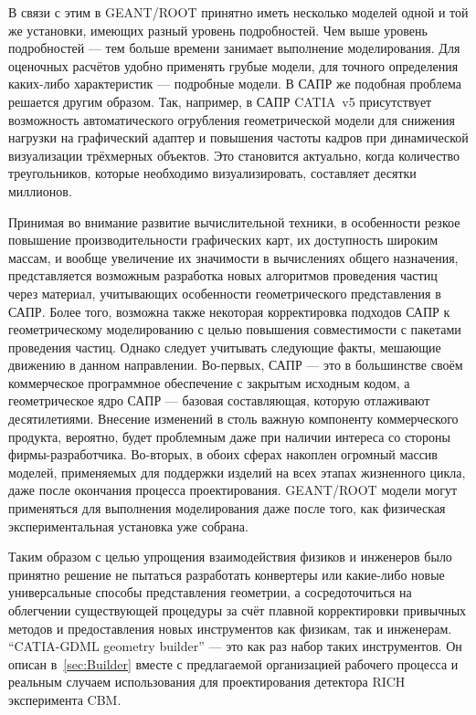В связи с этим в GEANT/ROOT принятно иметь несколько моделей одной и той же установки, имеющих разный уровень подробностей. Чем выше уровень подробностей --- тем больше времени занимает выполнение моделирования. Для оценочных расчётов удобно применять грубые модели, для точного определения каких-либо характеристик --- подробные модели. В САПР же подобная проблема решается другим образом. Так, например, в САПР CATIA~v5 присутствует возможность автоматического огрубления геометрической модели для снижения нагрузки на графический адаптер и повышения частоты кадров при динамической визуализации трёхмерных объектов. Это становится актуально, когда количество треугольников, которые необходимо визуализировать, составляет десятки миллионов.

Принимая во внимание развитие вычислительной техники, в особенности резкое повышение производительности графических карт, их доступность широким массам, и вообще увеличение их значимости в вычислениях общего назначения, представляется возможным разработка новых алгоритмов проведения частиц через материал, учитывающих особенности геометрического представления в САПР. Более того, возможна также некоторая корректировка подходов САПР к геометрическому моделированию с целью повышения совместимости с пакетами проведения частиц. Однако следует учитывать следующие факты, мешающие движению в данном направлении. Во-первых, САПР --- это в большинстве своём коммерческое программное обеспечение с закрытым исходным кодом, а геометрическое ядро САПР --- базовая составляющая, которую отлаживают десятилетиями. Внесение изменений в столь важную компоненту коммерческого продукта, вероятно, будет проблемным даже при наличии интереса со стороны фирмы-разработчика. Во-вторых, в обоих сферах накоплен огромный массив моделей, применяемых для поддержки изделий на всех этапах жизненного цикла, даже после окончания процесса проектирования. GEANT/ROOT модели могут применяться для выполнения моделирования даже после того, как физическая экспериментальная установка уже собрана.

Таким образом с целью упрощения взаимодействия физиков и инженеров было принятно решение не пытаться разработать конвертеры или какие-либо новые универсальные способы представления геометрии, а сосредоточиться на облегчении существующей процедуры за счёт плавной корректировки привычных методов и предоставления новых инструментов как физикам, так и инженерам. ``CATIA-GDML geometry builder'' --- это как раз набор таких инструментов. Он описан в~\ref{sec:Builder} вместе с предлагаемой организацией рабочего процесса и реальным случаем использования для проектирования детектора RICH эксперимента CBM.

